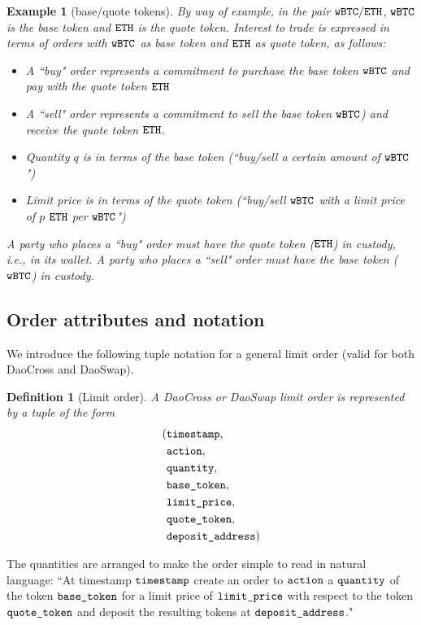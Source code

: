 \documentclass[11pt, reqno]{amsart}
\newtheorem{definition}[thm]{Definition}
\newtheorem{example}[thm]{Example}
\newcommand{\BTC}{\textnormal{\texttt{wBTC}}}
\newcommand{\ETH}{\textnormal{\texttt{ETH}}}
\newcommand{\timestamp}{\textnormal{\texttt{timestamp}}}
\newcommand{\action}{\textnormal{\texttt{action}}}
\newcommand{\quantity}{\textnormal{\texttt{quantity}}}
\newcommand{\basetoken}{\textnormal{\texttt{base\_token}}}
\newcommand{\limitprice}{\textnormal{\texttt{limit\_price}}}
\newcommand{\quotetoken}{\textnormal{\texttt{quote\_token}}}
\newcommand{\depositaddress}{\textnormal{\texttt{deposit\_address}}}
\begin{document}
\begin{example}[base/quote tokens]
By way of example, in the pair $\BTC/\ETH$, $\BTC$ is the base token and $\ETH$
is the quote token. Interest to trade is expressed in terms of orders
with $\BTC$ as base token and $\ETH$ as quote token, as follows:
\begin{itemize}
	\item A ``buy" order represents a commitment to purchase the base token
        $\BTC$ and pay with the quote token $\ETH$
	\item A ``sell" order represents a commitment to sell the base token
	      $\BTC$) and receive the quote token $\ETH$.
	\item Quantity $q$ is in terms of the base token (``buy/sell a certain
	      amount of $\BTC$")
	\item Limit price is in terms of the quote token (``buy/sell $\BTC$ with a
	      limit price of $p$ $\ETH$ per $\BTC$")
\end{itemize}
A party who places a ``buy" order must have the quote token ($\ETH$) in custody,
i.e., in its wallet. A party who places a ``sell" order must have the base
token ($\BTC$) in custody.
\end{example}

\subsection{Order attributes and notation}
We introduce the following tuple notation for a general limit order
(valid for both DaoCross and DaoSwap).
\begin{definition}[Limit order]
A DaoCross or DaoSwap limit order is represented by a tuple of the form
\begin{align*}
    ( & \timestamp,       \\
      & \action,          \\
      & \quantity,        \\
      & \basetoken,       \\
      & \limitprice,      \\
      & \quotetoken,      \\
      & \depositaddress )
\end{align*}
\end{definition}

The quantities are arranged to make the order simple to read in natural
language:
``At timestamp $\timestamp$ create an order to $\action$ a $\quantity$ of
the token $\basetoken$ for a limit price of $\limitprice$ with respect to
the token $\quotetoken$ and deposit the resulting tokens at $\depositaddress$."
\end{document}
